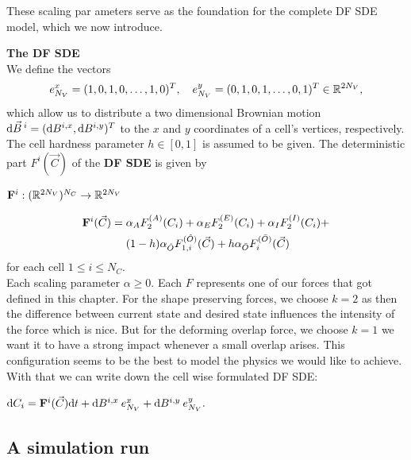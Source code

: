 These scaling par
ameters serve as the foundation for the complete DF SDE model, which we now introduce.
\begin{definition} \textbf{The DF SDE} \\
	We define the vectors
	\[
	e_{N_V}^{x} = (1,0,1,0,\ldots,1,0)^T, \quad e_{N_V}^{y} = (0,1,0,1,\ldots,0,1)^T \in \mathbb{R}^{2N_V},
	\]
	which allow us to distribute a two dimensional Brownian motion \(\mathrm{d} \vec{B}^{\:i} = (\mathrm{d} B^{i,x}, \mathrm{d} B^{i,y})^T\) to the $x$ and $y$ coordinates of a cell's vertices, respectively.
	The cell hardness parameter $h \in [0,1]$ is assumed to be given.
	The deterministic part $F^{i}(\vec{C})$ of the \textbf{DF SDE} is given by 
	\begin{center}
		$ \mathbf{F}^i: (\mathbb{R}^{2N_V})^{N_C} \rightarrow \mathbb{R}^{2N_V} $
	\end{center}
	\begin{align}
		\begin{split}
			\mathbf{F}^{i}(\vec{C}) = \; & \alpha_{A} F_2^{(A)}(C_i) + \alpha_{E} F_2^{(E)}(C_i) + \alpha_{I} F_2^{(I)}(C_i) + \\
			& (1-h)\alpha_{\hat{O}} F_{1,i}^{(\hat{O})}(\vec{C}) + h \alpha_{\bar{O}} F_i^{(\bar{O})}(\vec{C})
		\end{split}
	\end{align}
	for each cell $1 \leq i \leq N_C$. \\ 
	Each scaling parameter $\alpha \geq 0$. 
	Each $F$ represents one of our forces that got defined in this chapter. 
	For the shape preserving forces, we choose $k=2$ as then the difference between current state and desired state influences the intensity of the force which is nice.
	But for the deforming overlap force, we choose $k=1$ we want it to have a strong impact whenever a small overlap arises. 
	This configuration seems to be the best to model the physics we would like to achieve. 
	With that we can write down the cell wise formulated DF SDE:
	\begin{center}
		$\mathrm{d} C_i = \mathbf{F}^{i}(\vec{C}) \mathrm{d} t + \mathrm{d} B^{i,x} \: e_{N_V}^{x} + \mathrm{d} B^{i,y} \: e_{N_V}^{y}.$
	\end{center} 


\end{definition}


\subsection{A simulation run}
